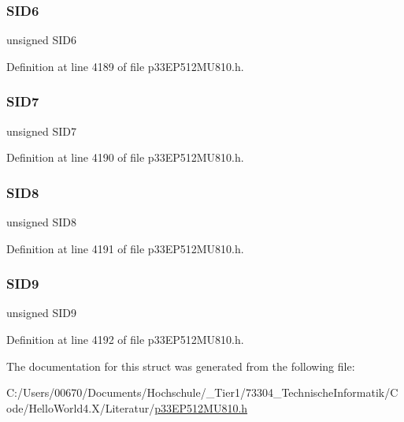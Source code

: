 \subsubsection{\texorpdfstring{S\+I\+D6}{SID6}}
{\footnotesize\ttfamily unsigned S\+I\+D6}



Definition at line 4189 of file p33\+E\+P512\+M\+U810.\+h.

\mbox{\label{structtag_c1_r_x_f8_s_i_d_b_i_t_s_a34097fb76decd431701fa2d86a22328e}} 
\subsubsection{\texorpdfstring{S\+I\+D7}{SID7}}
{\footnotesize\ttfamily unsigned S\+I\+D7}



Definition at line 4190 of file p33\+E\+P512\+M\+U810.\+h.

\mbox{\label{structtag_c1_r_x_f8_s_i_d_b_i_t_s_afe74894633244fdb0b0c01b4e8c522e7}} 
\subsubsection{\texorpdfstring{S\+I\+D8}{SID8}}
{\footnotesize\ttfamily unsigned S\+I\+D8}



Definition at line 4191 of file p33\+E\+P512\+M\+U810.\+h.

\mbox{\label{structtag_c1_r_x_f8_s_i_d_b_i_t_s_a33587704948067005c2a6a3ccc503c99}} 
\subsubsection{\texorpdfstring{S\+I\+D9}{SID9}}
{\footnotesize\ttfamily unsigned S\+I\+D9}



Definition at line 4192 of file p33\+E\+P512\+M\+U810.\+h.



The documentation for this struct was generated from the following file\+:\begin{DoxyCompactItemize}
\item 
C\+:/\+Users/00670/\+Documents/\+Hochschule/\+\_\+\+Tier1/73304\+\_\+\+Technische\+Informatik/\+Code/\+Hello\+World4.\+X/\+Literatur/\hyperlink{p33_e_p512_m_u810_8h}{p33\+E\+P512\+M\+U810.\+h}\end{DoxyCompactItemize}
